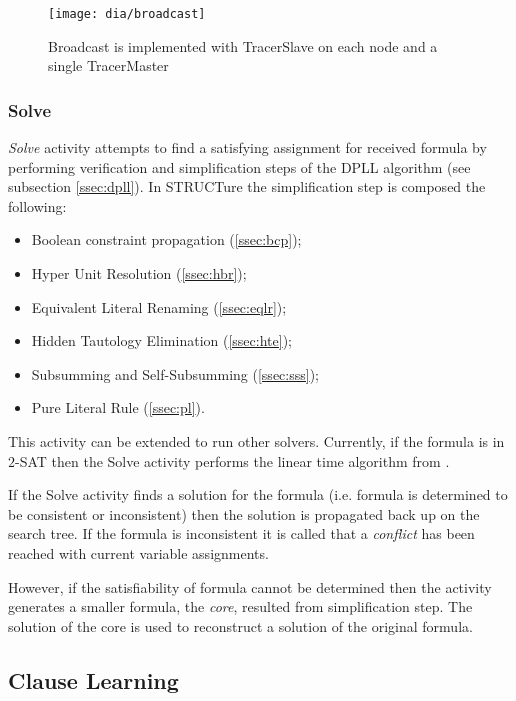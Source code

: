\begin{figure}[h]
  \centering
  \texttt{[image: dia/broadcast]}
  \caption{Broadcast is implemented with
  TracerSlave on each node and a single TracerMaster}
  \label{fig:broadcast}
\end{figure}


\subsubsection{Solve}
\label{sssec:solve}

\emph{Solve} activity attempts to find a satisfying assignment for
received formula by performing verification and simplification
steps of the DPLL algorithm (see subsection \ref{ssec:dpll}).
In STRUCTure the simplification step is composed the following:
\begin{itemize}
  \item Boolean constraint propagation (\ref{ssec:bcp});
  \item Hyper Unit Resolution (\ref{ssec:hbr});
  \item Equivalent Literal Renaming (\ref{ssec:eqlr});
  \item Hidden Tautology Elimination (\ref{ssec:hte});
  \item Subsumming and Self-Subsumming (\ref{ssec:sss});
  \item Pure Literal Rule (\ref{ssec:pl}).
\end{itemize}

This activity can be extended to run other solvers. Currently,
if the formula is in $2$-SAT then the Solve activity performs the
linear time algorithm from \cite{mine:tarjan}.

If the Solve activity finds a solution for the formula (i.e.
formula is determined to be consistent or inconsistent) then the
solution is propagated back up on the search tree. If the formula
is inconsistent it is called that a \emph{conflict} has been reached
with current variable assignments.

However, if the satisfiability of formula cannot be determined
then the activity generates a smaller formula, the \emph{core},
resulted from simplification step. The solution of the core is used
to reconstruct a solution of the original formula.


\subsection{Clause Learning}
\label{ssec:learning}

